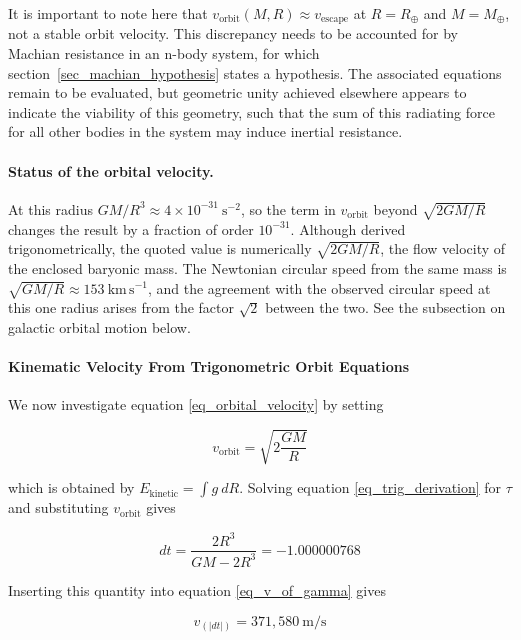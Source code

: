 \documentclass[pdflatex,sn-mathphys-num]{sn-jnl}%
\theoremstyle{thmstyleone}%
\theoremstyle{thmstyletwo}%
\theoremstyle{thmstylethree}%
\begin{document}
\begin{appendices}
It is important to note here that $v_{\text{orbit}} \left( M, R \right) \approx v_{\text{escape}}$ at $R = R_{\oplus}$ and $M=M_{\oplus}$, not a stable orbit velocity. This discrepancy needs to be accounted for by Machian resistance in an n-body system, for which section~\ref{sec_machian_hypothesis} states a hypothesis. The associated equations remain to be evaluated, but geometric unity achieved elsewhere appears to indicate the viability of this geometry, such that the sum of this radiating force for all other bodies in the system may induce inertial resistance.


\paragraph{Status of the orbital velocity.} At this radius $GM/R^3\approx4\times10^{-31}~\mathrm{s^{-2}}$, so the term in $v_{\mathrm{orbit}}$ beyond $\sqrt{2GM/R}$ changes the result by a fraction of order $10^{-31}$. Although derived trigonometrically, the quoted value is numerically $\sqrt{2GM/R}$, the flow velocity of the enclosed baryonic mass. The Newtonian circular speed from the same mass is $\sqrt{GM/R}\approx153~\mathrm{km\,s^{-1}}$, and the agreement with the observed circular speed at this one radius arises from the factor $\sqrt{2}$ between the two. See the subsection on galactic orbital motion below.


\paragraph{Kinematic Velocity From Trigonometric Orbit Equations}

We now investigate equation \ref{eq_orbital_velocity} by setting 

\begin{equation}
    v_{\text{orbit}} = \sqrt{2 \frac{GM}{R}}
\end{equation}

which is obtained by $E_{\text{kinetic}} = \int g\ dR$. Solving equation \ref{eq_trig_derivation} for $\tau$ and substituting $v_{\text{orbit}}$ gives

\begin{equation}
    dt = \frac{2 R^{3}}{G M - 2 R^{3}} = -1.000000768
\end{equation}

Inserting this quantity into equation \ref{eq_v_of_gamma} gives

\begin{equation}
    v_{\left( \left|dt\right| \right)} = 371,580 ~ \text{m} / \text{s}
\end{equation}


\end{appendices}
\end{document}
